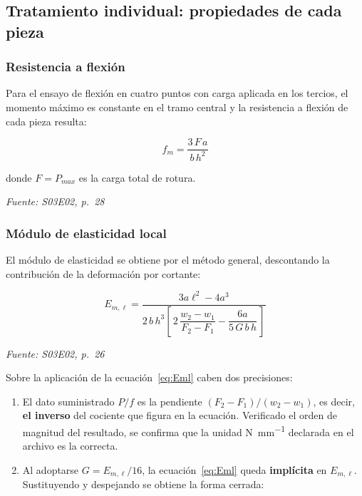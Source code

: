 \documentclass[11pt,a4paper]{article}
\newcommand{\fuente}[1]{{\small\textit{Fuente: #1}}}
\newcommand{\fm}{f_{m}}
\newcommand{\Eml}{E_{m,\ell}}
\begin{document}
\subsection{Tratamiento individual: propiedades de cada pieza}

\subsubsection{Resistencia a flexión}

Para el ensayo de flexión en cuatro puntos con carga aplicada en los tercios, el
momento máximo es constante en el tramo central y la resistencia a flexión de cada
pieza resulta:

\begin{equation}
\fm = \frac{3\,F\,a}{b\,h^{2}}
\label{eq:fm}
\end{equation}

\noindent donde $F = P_{max}$ es la carga total de rotura.

\fuente{S03E02, p.~28}

\subsubsection{Módulo de elasticidad local}

El módulo de elasticidad se obtiene por el método general, descontando la
contribución de la deformación por cortante:

\begin{equation}
\Eml = \frac{3a\ell^{2} - 4a^{3}}
            {2\,b\,h^{3}\left[\,2\,\dfrac{w_{2}-w_{1}}{F_{2}-F_{1}}
             - \dfrac{6a}{5\,G\,b\,h}\,\right]}
\label{eq:Eml}
\end{equation}

\fuente{S03E02, p.~26}

\medskip
\noindent Sobre la aplicación de la ecuación~\eqref{eq:Eml} caben dos precisiones:

\begin{enumerate}
  \item El dato suministrado $P/f$ es la pendiente $(F_{2}-F_{1})/(w_{2}-w_{1})$, es
        decir, \textbf{el inverso} del cociente que figura en la ecuación. Verificado
        el orden de magnitud del resultado, se confirma que la unidad
        \si{\newton\per\milli\meter} declarada en el archivo es la correcta.
  \item Al adoptarse $G = \Eml/16$, la ecuación~\eqref{eq:Eml} queda \textbf{implícita}
        en $\Eml$. Sustituyendo y despejando se obtiene la forma cerrada:
\end{enumerate}
\end{document}
